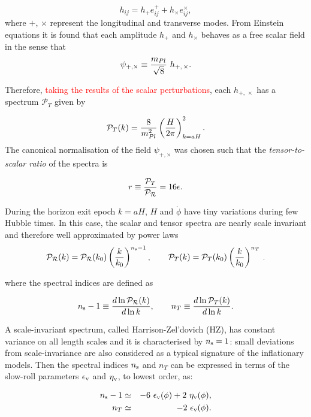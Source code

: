 \documentclass{rmaa}
\def\beq{\begin{equation}}
\def\eeq{\end{equation}}
\def\bea{\begin{eqnarray}}
\def\eea{\end{eqnarray}}
\def\cal{\mathcal}
\begin{document}
\beq
h_{ij}= h_{+}\mathit{e}^{+}_{ij}+h_{\times}\mathit{e}^{\times}_{ij},
\eeq
%
where $+$, $\times$ represent the longitudinal and transverse modes.
From Einstein equations it is found that each amplitude $h_{+}$ and $h_{\times}$
behaves as a free scalar field in the sense that
\beq
\psi_{+,\times}\equiv {m_{Pl} \over \sqrt 8}\,\,h_{+,\, \times}.
\eeq 

\noindent
Therefore, \textcolor{red}{taking the results of the scalar perturbations}, each $h_{+,\, \times}$ has a spectrum $\cal P_T$ given by

\beq
\cal P_{T}(k)={8 \over m_{Pl}^2} \left({H \over 2\pi} \right)_{k=aH}^2.
\eeq
%
The canonical normalisation of the field $\psi_{+,\times}$ was chosen such that
the \textit{tensor-to-scalar ratio} of the spectra is  

\begin{equation}
r \equiv {\cal P_{T} \over \cal P_{\cal R}} =16 \epsilon .
\end{equation}

During the horizon exit epoch $k=aH$, $H$ and $\dot \phi$ have
tiny variations during few Hubble times. In this case, the scalar and tensor 
spectra are nearly scale invariant and therefore well approximated by power laws 
%
\bea
\cal P_\cal R(k)  =\cal P_\cal R(k_0) \left( \frac{k}{k_0} \right)^{n_{\rm s}-1},\qquad %
\cal P_T(k)  = \cal P_T(k_0) \left( \frac{k}{k_0} \right)^{n_T} \, .
\eea

\noindent
where the spectral indices are defined as 

\beq
n_{\rm s}-1\equiv {d\ln \cal P_\cal R(k) \over d\ln k},\qquad
n_T \equiv {d\ln \cal P_T(k) \over d\ln k}. 
\eeq

\noindent
A scale-invariant spectrum, called Harrison-Zel'dovich (HZ), has constant variance
on all length scales and it is characterised by $n_{\rm s}= 1$:
small deviations from scale-invariance are also considered as a typical signature of the
inflationary models. 
Then the spectral indices $n_{\rm s}$ and $n_{T}$ can be expressed 
 in terms of the slow-roll parameters $\epsilon_{\rm v}$ and $\eta_{\rm v}$, to lowest order, as:

\bea \label{indices}
n_{\rm s} - 1  &\simeq&  - 6~ \epsilon_{\rm v}(\phi) + 2~ \eta_{\rm v}(\phi), \nonumber \\
n_T  &\simeq&  -2~ \epsilon_{\rm v}(\phi). 
\eea
\end{document}

